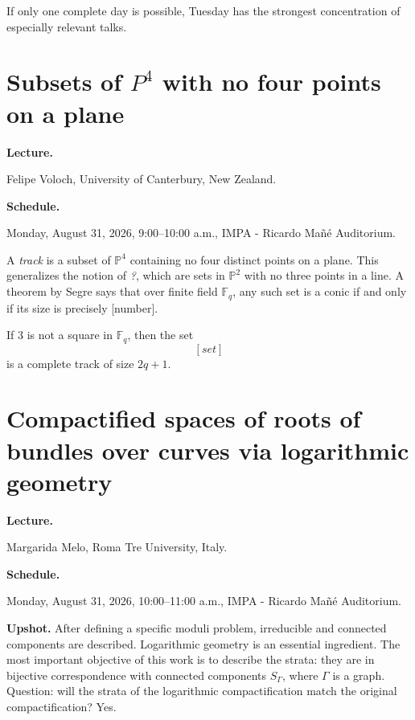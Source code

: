 If only one complete day is possible,
Tuesday has the strongest concentration
of especially relevant talks.

\section{Subsets of $P^4$ with no four
points on a plane}
\label{section-subsets-p4}

\medskip\noindent
{\bf Lecture.}

Felipe Voloch,
University of Canterbury, New Zealand.

\medskip\noindent
{\bf Schedule.}

Monday, August 31, 2026,
9:00--10:00 a.m.,
IMPA - Ricardo Ma\~n\'e Auditorium.

\medskip\noindent
A {\it track} is a subset
of $\mathbb{P}^4$ containing no four
distinct points on a plane.
This generalizes the notion of
{\it ?}, which are sets in $\mathbb{P}^2$
with no three points in a line.
A theorem by Segre says that over
finite field $\mathbb{F}_q$,
any such set is a conic if and only
if its size is precisely [number].

\begin{theorem}
\label{theorem-voloch}
If 3 is not a square in $\mathbb{F}_q$,
then the set
$$
[set]
$$
is a complete track of size $2q+1$.
\end{theorem}

\section{Compactified spaces of roots of
bundles over curves via logarithmic
geometry}
\label{section-compactified-roots-bundles}

\medskip\noindent
{\bf Lecture.}

Margarida Melo,
Roma Tre University, Italy.

\medskip\noindent
{\bf Schedule.}

Monday, August 31, 2026,
10:00--11:00 a.m.,
IMPA - Ricardo Ma\~n\'e Auditorium.

\medskip\noindent
{\bf Upshot.}
After defining a specific moduli problem,
irreducible and connected components
are described. Logarithmic geometry
is an essential ingredient.
The most important objective of this work
is to describe the strata: they are 
in bijective correspondence with
connected components $S_\Gamma$,
where $\Gamma$ is a graph.
Question: will the strata
of the logarithmic compactification
match the original compactification? Yes.



